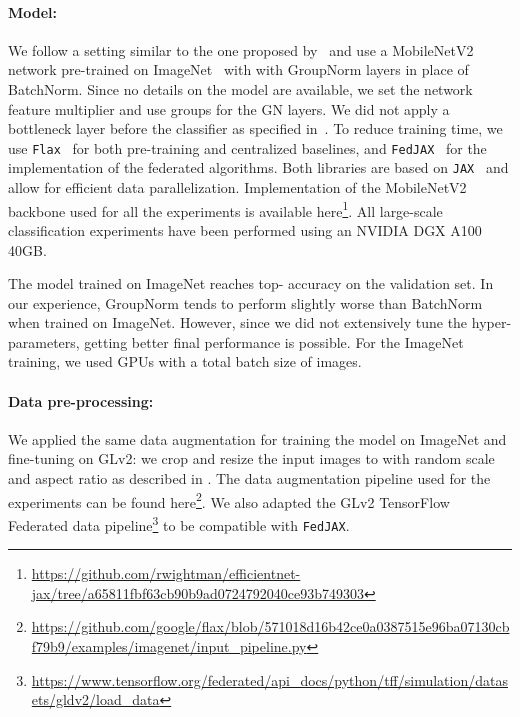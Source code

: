 \paragraph{Model:} 
We follow a setting similar to the one proposed by~\cite{hsu2020federated} and use a MobileNetV2~\cite{sandler2018mobilenetv2} network pre-trained on ImageNet~\cite{deng2009imagenet} with with GroupNorm layers in place of BatchNorm. Since no details on the model are available, we set the network feature multiplier  and use  groups for the GN layers. We did not apply a bottleneck layer before the classifier as specified in~\cite{hsu2020federated}.
To reduce training time, we use \texttt{Flax}~\cite{flax2020github} for both pre-training and centralized baselines, and \texttt{FedJAX}~\cite{ro2021fedjax} for the implementation of the federated algorithms. Both libraries are based on \texttt{JAX}~\cite{jax2018github} and allow for efficient data parallelization. Implementation of the MobileNetV2 backbone used for all the experiments is available here\footnote{\url{https://github.com/rwightman/efficientnet-jax/tree/a65811fbf63cb90b9ad0724792040ce93b749303}}. All large-scale classification experiments have been performed using an NVIDIA DGX A100 40GB. 

The model trained on ImageNet reaches  top- accuracy on the validation set. In our experience, GroupNorm tends to perform slightly worse than BatchNorm when trained on ImageNet. However, since we did not extensively tune the hyper-parameters, getting better final performance is possible. For the ImageNet training, we used  GPUs with a total batch size of  images.

\paragraph{Data pre-processing:} We applied the same data augmentation for training the model on ImageNet and fine-tuning on GLv2: we crop and resize the input images to  with random scale and aspect ratio as described in \cite{szegedy2015going}. 
The data augmentation pipeline used for the experiments can be found here\footnote{\url{https://github.com/google/flax/blob/571018d16b42ce0a0387515e96ba07130cbf79b9/examples/imagenet/input_pipeline.py}}.
We also adapted the GLv2 TensorFlow Federated data pipeline\footnote{
\url{https://www.tensorflow.org/federated/api_docs/python/tff/simulation/datasets/gldv2/load_data}} to be compatible with \texttt{FedJAX}.

